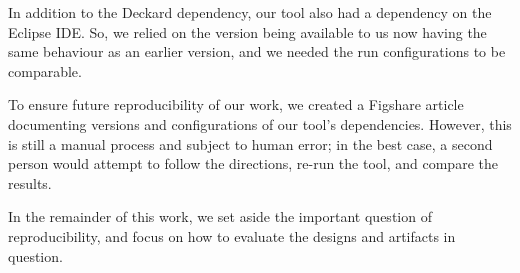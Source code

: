 In addition to the Deckard dependency, our tool also had a dependency on the Eclipse IDE. So, we relied on the version being available to us now having the same behaviour as an earlier version, and we needed the run configurations to be comparable.

To ensure future reproducibility of our work, we created a Figshare article documenting versions and configurations of our tool's dependencies. However, this is still a manual process and subject to human error; in the best case, a second person would attempt to follow the directions, re-run the tool, and compare the results.

In the remainder of this work, we set aside the important question of reproducibility, and focus on how to evaluate the designs and artifacts in question.
